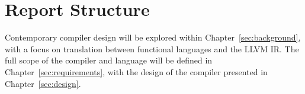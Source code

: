 \section{Report Structure}

Contemporary compiler design will be explored within Chapter~\ref{sec:background}, with a focus on
translation between functional languages and the LLVM IR. The full scope of the compiler and
language will be defined in Chapter~\ref{sec:requirements}, with the design of the compiler
presented in Chapter~\ref{sec:design}.
